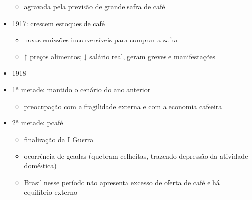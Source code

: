 \documentclass[a4paper,12pt]{article}[abntex2]
\begin{document}
\begin{itemize}
\begin{itemize}
\end{itemize}
\begin{itemize}
    \item agravada pela previsão de grande safra de café
\end{itemize}
\item  1917: crescem estoques de café
\begin{itemize}
    \item novas emissões inconversíveis para comprar a safra
\end{itemize}
\begin{itemize}
    \item  ↑ preços alimentos; ↓ salário real, geram greves e manifestações
\end{itemize}
\item 1918
\item  1ª metade: mantido o cenário do ano anterior
\begin{itemize}
    \item preocupação com a fragilidade externa e com a economia cafeeira
\end{itemize}
\item  2ª metade: pcafé
\begin{itemize}
    \item finalização da I Guerra
\end{itemize}
\begin{itemize}
    \item ocorrência de geadas (quebram colheitas, trazendo depressão da atividade doméstica)
\end{itemize}
\begin{itemize}
    \item Brasil nesse período não apresenta excesso de oferta de café e há equilíbrio externo
\end{itemize}
\end{itemize}
\end{document}

